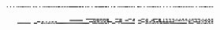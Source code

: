 \documentclass[10pt]{article}
\theoremstyle{plain}
\theoremstyle{definition}
\begin{document}
\begin{table*}[b]
{\begin{minipage}{5.32in}
\[\begin{array}{@{}r@{}}
\begin{array}{@{}l@{}}
\a\a\a\b\a\a\a\b\a\a\a\b\a\a\a\b\a\b\a\b\a\b\b\b\a\b\a\b\a\b\a\b\a\a\a\b \a\b\a\b\a\a\a\b\a\a\a\b\a\b\a\b\a\b\b\b\a\b\a\b\a\b\a\b\a\b\b\b\a\b\a\b \a\b\a\b\a\b\a\b\b\b\b\b\b\b\b\b\b\b\a\b\b\b\a\b\b\a\a\b\a\b\a\b\a\a\a\b \a\a\a\b\b\b\a\b\b\b\b\b\b\b\a\b\b\b\a\b\a\a\a\b\a\a\b\b\a\a\a\b\a\b\a\b \a\b\a\b\b\b\b\b\a\b\a\b\a\b\a\b\a\a\a\b\b\b\a\b\a\a\a\b\a\a\a\b\a\b\a\b \a\b\b\b\a\b\a\b\a\b\a\b\a\a\a\b\a\a\a\b\a\a\a\b\a\a\a\b\a\b\a\b\a\b\b\b \a\b\a\b\a\b\a\b\a\b\a\b\a\b\a\b\a\a\a\b\a\a\a\b\a\b\a\b\a\b\b\b\a\b\a\b \a\b\a\b
\end{array}
\mynnl
\begin{array}{@{}l@{}}
\a\a\a\a\a\a\a\a\a\a\a\a\a\a\a\a\a\a\a\a\a\a\a\a\a\a\a\a\a\a\a\a\a\a\a\a \a\a\a\a\a\a\a\a\a\a\a\a\a\a\a\a\a\a\a\a\a\a\a\a\a\a\a\a\a\a\a\a\a\a\a\a \a\a\a\a\a\a\a\a\a\a\a\a\a\a\a\a\a\a\a\a\a\a\a\a\a\a\a\a\b\b\b\b\b\b\b\b \b\b\b\b\a\b\b\b\a\b\b\b\a\b\b\b\a\b\b\b\a\a\a\a\a\a\a\a\b\b\b\b\a\b\b\b \a\a\a\a\a\a\a\a\b\b\b\b\a\a\b\b\a\a\a\a\a\a\a\a\b\b\b\b\a\a\b\b\a\a\a\a \a\a\b\b\b\b\b\b\a\b\b\b\a\a\a\b\a\a\b\b\a\a\b\b\a\a\b\b\a\a\a\b\a\a\a\b \a\a\b\b\a\a\b\b\a\a\a\b\a\a\b\b\a\b\b\b\a\b\b\b\a\a\a\b\a\a\a\b\a\a\b\b \a\a\b\b\mynl
\a\a\a\a\a\a\a\a\a\a\a\a\a\a\a\a\a\a\a\a\a\a\a\a\a\a\a\a\a\a\a\a\a\a\a\a \a\a\a\a\a\a\a\a\a\a\a\a\a\a\a\a\a\a\a\a\a\a\a\a\a\a\a\a\a\a\a\a\a\a\a\a \a\a\a\a\a\a\a\a\b\b\b\b\b\b\b\b\b\b\b\b\b\b\b\b\a\a\a\a\a\a\a\a\a\a\a\a \a\b\a\b\a\b\b\b\a\b\a\b\a\b\a\b\a\b\b\b\a\a\a\a\a\a\a\a\a\a\a\a\a\b\b\b \a\a\a\a\b\b\b\b\a\a\a\a\a\b\b\b\a\a\a\a\b\b\b\b\a\a\a\a\a\b\b\b\a\a\a\a \b\b\b\b\a\a\a\a\a\b\b\b\a\a\a\b\a\a\a\b\a\a\a\b\a\a\a\b\a\b\a\b\a\b\b\b \a\b\a\b\a\b\a\b\a\b\a\b\a\b\a\b\a\a\a\b\a\a\a\b\a\b\a\b\a\b\b\b\a\b\a\b \a\b\a\b\mynl
\a\a\a\a\a\a\a\a\a\a\a\a\a\a\a\a\a\a\a\a\a\a\a\a\a\a\a\a\a\a\a\a\a\a\a\a \a\a\a\a\b\b\b\b\a\a\b\b\a\a\a\b\a\a\a\b\a\a\b\b\a\a\b\b\a\a\a\a\a\a\a\a \a\a\a\a\a\a\a\a\a\a\a\a\a\a\a\a\a\a\a\a\a\a\a\a\a\a\a\a\a\a\a\a\b\b\b\b \b\a\b\b\a\a\b\b\a\a\a\b\a\a\b\b\a\a\b\b\b\b\b\b\a\a\a\a\b\b\b\b\b\b\b\b \a\a\a\a\a\a\a\a\a\a\a\a\a\a\a\a\a\a\a\a\a\a\a\a\b\b\b\b\a\a\b\b\a\a\b\b \a\a\a\b\b\a\b\b\b\a\b\b\b\a\b\b\b\a\b\b\b\a\b\b\b\a\b\b\a\a\a\a\a\a\a\a \a\a\a\a\a\a\a\a\a\a\b\b\a\a\a\a\b\b\b\b\b\a\b\b\a\a\a\b\a\a\a\b\a\a\b\b \a\a\b\b\mynl
\a\a\a\a\a\a\a\a\a\a\a\a\a\a\a\a\b\b\b\b\b\b\b\b\b\b\b\b\b\b\b\b\a\a\a\a \b\b\b\b\a\a\a\a\a\b\b\b\a\b\a\b\a\b\b\b\a\b\a\b\a\b\a\b\b\b\b\b\b\b\b\b \b\b\b\b\b\b\b\b\b\b\b\b\b\b\b\b\b\b\b\b\b\b\b\b\b\b\b\b\b\b\b\b\a\a\a\a \b\b\b\b\b\b\a\b\b\b\b\b\b\b\a\b\b\b\a\b\a\a\a\a\b\b\b\b\a\a\a\a\b\a\a\b \b\b\b\b\b\b\b\b\b\b\b\b\b\b\b\b\a\a\a\a\b\b\b\b\a\a\a\a\a\b\b\b\a\b\a\b \a\b\b\b\a\b\a\b\a\b\a\b\b\b\a\b\b\b\b\b\b\b\a\b\b\b\b\b\b\b\b\b\b\b\b\b \b\b\b\b\b\b\b\b\a\a\b\b\b\b\b\b\a\a\a\a\b\b\b\b\a\b\a\b\a\b\b\b\a\b\a\b \a\b\a\b\mynl

\end{array}
\end{array}\]
\end{minipage}}
\end{table*}
\end{document}
